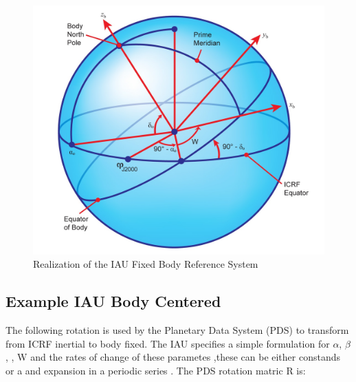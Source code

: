 \begin{figure}[htp]
\centering
\includegraphics [width=7in]{figs/fig3.png}
\caption{Realization of the IAU Fixed Body Reference System}
\label{fig:3}
\end{figure}

\newpage
\subsection{Example IAU Body Centered}

The following rotation is used by the Planetary Data System (PDS) to transform 
from ICRF inertial to body fixed. The IAU specifies a simple formulation for $\alpha$,
$\beta$, , W and the rates of change of these parametes ,these can be either constands or a
and expansion in a periodic series \cite{IAU2006}.
The PDS rotation matric R is:

